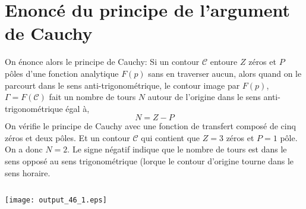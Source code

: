 \section{Enoncé du principe de l'argument de Cauchy}
On énonce alors le principe de Cauchy:
Si un contour \(\mathcal{C}\) entoure \(Z\) zéros et \(P\) pôles d'une
fonction analytique \(F(p)\) sans en traverser aucun, alors quand on le
parcourt dans le sens anti-trigonométrique, le contour image par
\(F(p)\), \(\Gamma=F(\mathcal{C})\) fait un nombre de tours \(N\) autour
de l'origine dans le sens anti-trigonométrique égal à,
\[
    N=Z-P
\]
On vérifie le principe de Cauchy avec une fonction de transfert composé
de cinq zéros et deux pôles. Et un contour \(\mathcal{C}\) qui contient 
que \(Z=3\) zéros et \(P=1\) pôle. On a donc \(N=2\). Le signe négatif
indique que le nombre de tours est dans le sens opposé au sens
trigonométrique (lorque le contour d'origine tourne dans le sens
horaire.
\begin{tcolorbox}[breakable, size=fbox, boxrule=1pt, 
    pad at break*=1mm,colback=cellbackground, colframe=cellborder]
\inputminted{python}{codes/python/annexe_cauchy_cellule17.py}
\end{tcolorbox}
\begin{center}
    \texttt{[image: output\_46\_1.eps]}
\end{center}

